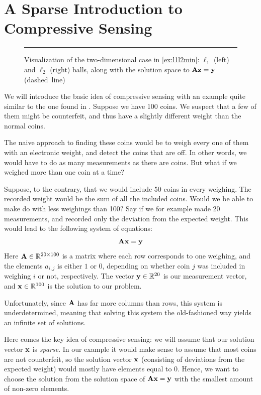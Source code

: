 \chapter{A Sparse Introduction to Compressive Sensing}
\label{sec:basic_cs}
\begin{figure}[t]
	\centering
	
	\caption{Visualization of the two-dimensional case in \cref{ex:l1l2min}: $ \ell_{1} $ (left) and $ \ell_{2} $ (right) balls, along with the solution space to $ \mathbf{A}\mathbf{z} = \mathbf{y} $ (dashed~line)}
	\label{fig:l1l2balls}
	\vspace{4pt}\hrule
\end{figure}
We will introduce the basic idea of compressive sensing with an example quite similar to the one found in \cite{bryan13makingdo}. Suppose we have 100 coins. We suspect that a few of them might be counterfeit, and thus have a slightly different weight than the normal coins. 

The naive approach to finding these coins would be to weigh every one of them with an electronic weight, and detect the coins that are off. In other words, we would have to do as many measurements as there are coins. But what if we weighed more than one coin at a time?

Suppose, to the contrary, that we would include 50 coins in every weighing. The recorded weight would be the sum of all the included coins. Would we be able to make do with less weighings than 100? Say if we for example made 20 measurements, and recorded only the deviation from the expected weight. This would lead to the following system of equations:
\[
	\mathbf{A}\mathbf{x} = \mathbf{y}
\]
Here $ \mathbf{A} \in \mathbb{R}^{20 \times 100} $ is a matrix where each row corresponds to one weighing, and the elements $ a_{i,j} $ is either $ 1 $ or $ 0 $, depending on whether coin $ j $ was included in weighing $ i $ or not, respectively. The vector $ \mathbf{y} \in \mathbb{R}^{20} $ is our measurement vector, and $ \mathbf{x} \in \mathbb{R}^{100} $ is the solution to our problem. 

Unfortunately, since $ \mathbf{A} $ has far more columns than rows, this system is underdetermined, meaning that solving this system the old-fashioned way yields an infinite set of solutions. 

Here comes the key idea of compressive sensing: we will assume that our solution vector $ \mathbf{x} $ is \textit{sparse}. In our example it would make sense to assume that most coins are not counterfeit, so the solution vector $ \mathbf{x} $ (consisting of deviations from the expected weight) would mostly have elements equal to $ 0 $. Hence, we want to choose the solution from the solution space of $ \mathbf{A}\mathbf{x} = \mathbf{y} $ with the smallest amount of non-zero elements.

